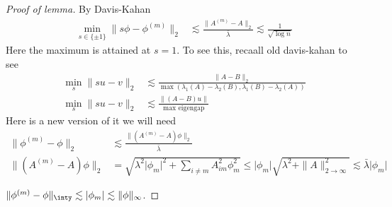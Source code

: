 \begin{proof}[Proof of lemma]
  By Davis-Kahan
  \begin{align}
    \min_{s \in \{\pm 1\}} \|s\phi - \phi^{(m)}\|_2
    &\lesssim \frac{\|A^{(m)} - A\|_2}{\bar\lambda}
    \lesssim \frac{1}{\sqrt{\log n}}
  \end{align}
  Here the maximum is attained at $s=1$. To see this, recaall old davis-kahan
  to see
  \begin{align}
    \min_s \|s u - v\|_2 &\lesssim \frac{\|A - B\|_2}{\max(\lambda_1(A) - \lambda_2(B), \lambda_1(B) - \lambda_2(A))} \\
    \min_s \|s u - v\|_2 &\lesssim \frac{\|(A-B)u\|}{\text{max eigengap}}
  \end{align}
  Here is a new version of it we will need
  \begin{align}
    \|\phi^{(m)} - \phi\|_2
    &\lesssim \frac{\|(A^{(m)} - A)\phi\|_2}{\bar\lambda} \\
    \|(A^{(m)} - A)\phi\|_2
    &= \sqrt{\lambda^2 \lvert \phi_m\rvert^2  + \sum_{i \neq m} A_{im}^2 \phi_m^2}
    \leq \lvert \phi_m\rvert \sqrt{\lambda^2 + \|A\|_{2 \to \infty}^2}
    \lesssim \bar\lambda \lvert \phi_m \rvert
  \end{align}


  $\|\phi^{(m)} - \phi\|_\inty \lesssim \lvert \phi_m \rvert \lesssim \|\phi\|_\infty$.

\end{proof}
